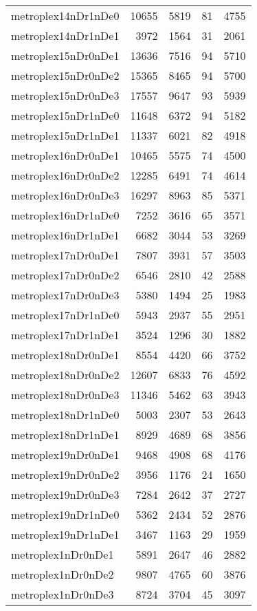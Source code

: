 \documentclass[../../../thesis.tex]{subfiles}
\begin{document}
\begin{longtable}{lrrrr}
metroplex14nDr1nDe0 & 10655 & 5819 & 81 & 4755 \\
metroplex14nDr1nDe1 & 3972 & 1564 & 31 & 2061 \\
metroplex15nDr0nDe1 & 13636 & 7516 & 94 & 5710 \\
metroplex15nDr0nDe2 & 15365 & 8465 & 94 & 5700 \\
metroplex15nDr0nDe3 & 17557 & 9647 & 93 & 5939 \\
metroplex15nDr1nDe0 & 11648 & 6372 & 94 & 5182 \\
metroplex15nDr1nDe1 & 11337 & 6021 & 82 & 4918 \\
metroplex16nDr0nDe1 & 10465 & 5575 & 74 & 4500 \\
metroplex16nDr0nDe2 & 12285 & 6491 & 74 & 4614 \\
metroplex16nDr0nDe3 & 16297 & 8963 & 85 & 5371 \\
metroplex16nDr1nDe0 & 7252 & 3616 & 65 & 3571 \\
metroplex16nDr1nDe1 & 6682 & 3044 & 53 & 3269 \\
metroplex17nDr0nDe1 & 7807 & 3931 & 57 & 3503 \\
metroplex17nDr0nDe2 & 6546 & 2810 & 42 & 2588 \\
metroplex17nDr0nDe3 & 5380 & 1494 & 25 & 1983 \\
metroplex17nDr1nDe0 & 5943 & 2937 & 55 & 2951 \\
metroplex17nDr1nDe1 & 3524 & 1296 & 30 & 1882 \\
metroplex18nDr0nDe1 & 8554 & 4420 & 66 & 3752 \\
metroplex18nDr0nDe2 & 12607 & 6833 & 76 & 4592 \\
metroplex18nDr0nDe3 & 11346 & 5462 & 63 & 3943 \\
metroplex18nDr1nDe0 & 5003 & 2307 & 53 & 2643 \\
metroplex18nDr1nDe1 & 8929 & 4689 & 68 & 3856 \\
metroplex19nDr0nDe1 & 9468 & 4908 & 68 & 4176 \\
metroplex19nDr0nDe2 & 3956 & 1176 & 24 & 1650 \\
metroplex19nDr0nDe3 & 7284 & 2642 & 37 & 2727 \\
metroplex19nDr1nDe0 & 5362 & 2434 & 52 & 2876 \\
metroplex19nDr1nDe1 & 3467 & 1163 & 29 & 1959 \\
metroplex1nDr0nDe1 & 5891 & 2647 & 46 & 2882 \\
metroplex1nDr0nDe2 & 9807 & 4765 & 60 & 3876 \\
metroplex1nDr0nDe3 & 8724 & 3704 & 45 & 3097 \\

\end{longtable}
\end{document}
